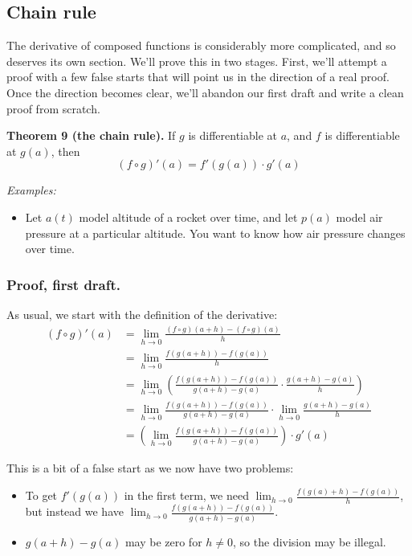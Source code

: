 \subsection{Chain rule}
The derivative of composed functions is considerably more complicated,
and so deserves its own section. We'll prove this in two stages.
First, we'll attempt a proof with a few false starts that will point
us in the direction of a real proof. Once the direction becomes clear,
we'll abandon our first draft and write a clean proof from scratch.

\vs

\textbf{Theorem 9 (the chain rule).} If $g$ is differentiable at $a$,
and $f$ is differentiable at $g(a)$, then
\[(f\circ g)'(a)=f'(g(a))\cdot g'(a)\]

\textit{Examples:}
\begin{itemize}
\item Let $a(t)$ model altitude of a rocket over time, and let $p(a)$
  model air pressure at a particular altitude. You want to know how
  air pressure changes over time.
\end{itemize}

\subsubsection*{Proof, first draft.}

As usual, we start with the definition of the derivative:
\begin{align*}
  (f\circ g)'(a)&=\lim_{h\to0}\frac{(f\circ g)(a+h)-(f\circ g)(a)}{h}\\
            &=\lim_{h\to0}\frac{f(g(a+h))-f(g(a))}{h}\\
            &=\lim_{h\to0}\left(\frac{f(g(a+h))-f(g(a))}{g(a+h)-g(a)}\cdot\frac{g(a+h)-g(a)}{h}\right)\\
            &=\lim_{h\to0}\frac{f(g(a+h))-f(g(a))}{g(a+h)-g(a)}\cdot\lim_{h\to0}\frac{g(a+h)-g(a)}{h}\\
            &=\left(\lim_{h\to0}\frac{f(g(a+h))-f(g(a))}{g(a+h)-g(a)}\right)\cdot g'(a)
\end{align*}

This is a bit of a false start as we now have two problems:
\begin{itemize}
\item To get $f'(g(a))$ in the first term, we need
  $\lim_{h\to0}\frac{f(g(a)+h)-f(g(a))}{h}$, but instead we have
  $\lim_{h\to0}\frac{f(g(a+h))-f(g(a))}{g(a+h)-g(a)}$.
\item $g(a+h)-g(a)$ may be zero for $h\neq 0$, so the division may be
  illegal.
\end{itemize}

